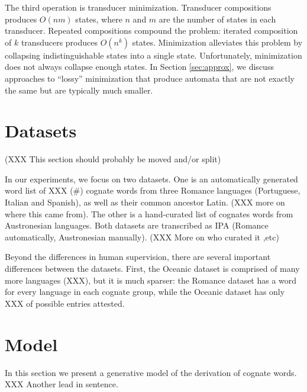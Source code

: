 \documentclass[11pt,a4paper]{article}
\begin{document}
The third operation is transducer minimization. Transducer compositions
produces $O(nm)$ states, where $n$ and $m$ are the number of states
in each transducer. Repeated compositions compound the problem:
iterated composition of $k$ transducers produces $O(n^k)$ states.
Minimization alleviates this problem by collapsing indistinguishable
states into a single state. Unfortunately, minimization does not
always collapse enough states. In Section \ref{sec:approx}, we discuss approaches
to ``lossy'' minimization that produce automata that are not exactly
the same but are typically much smaller.

\section{Datasets}

(XXX This section should probably be moved and/or split)

In our experiments, we focus on two datasets. One is an automatically
generated word list of XXX (\#) cognate words from three Romance
languages (Portuguese, Italian and Spanish), as well as their common
ancestor Latin. (XXX more on where this came from). The other is a
hand-curated list of cognates words from Austronesian languages.
Both datasets are transcribed as IPA (Romance automatically,
Austronesian manually). (XXX More on who curated it ,etc)

Beyond the differences in human supervision, there are several
important differences between the datasets. First, the Oceanic
dataset is comprised of many more languages (XXX), but it is much
sparser: the Romance dataset has a word for every language in each
cognate group, while the Oceanic dataset has only XXX of possible
entries attested.

\section{Model}

In this section we present a generative model of the derivation of
cognate words. XXX Another lead in sentence.
\end{document}
